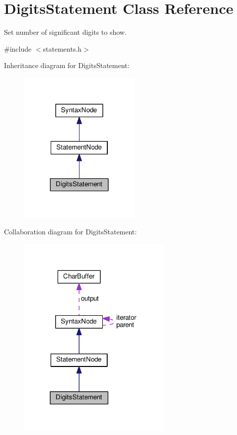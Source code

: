 \hypertarget{classDigitsStatement}{}\section{Digits\+Statement Class Reference}
\label{classDigitsStatement}


Set number of significant digits to show.  




{\ttfamily \#include $<$statements.\+h$>$}



Inheritance diagram for Digits\+Statement\+:\nopagebreak
\begin{figure}[H]
\begin{center}
\leavevmode
\includegraphics[width=167pt]{classDigitsStatement__inherit__graph}
\end{center}
\end{figure}


Collaboration diagram for Digits\+Statement\+:\nopagebreak
\begin{figure}[H]
\begin{center}
\leavevmode
\includegraphics[width=211pt]{classDigitsStatement__coll__graph}
\end{center}
\end{figure}
